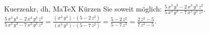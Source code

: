 \begin{MAufgabe}{Kuerzen}{kr, dh, MaTeX}
K\"urzen Sie soweit m\"oglich: $\frac{5\, x^3\, y^3 - 2\, x^3\, y^3\, z^2}{5\, x^3\, y^3 - 7\, x^3\, y^3\, z^2}$.\\ 
\ifLsg\MLoesung
\quad $\frac{5\, x^3\, y^3 - 2\, x^3\, y^3\, z^2}{5\, x^3\, y^3 - 7\, x^3\, y^3\, z^2}=\frac{(x^3\, y^3)\cdot(5 - 2\, z^2)}{(x^3\, y^3)\cdot(5 - 7\, z^2)}=\frac{5 - 2\, z^2}{5 - 7\, z^2}=\frac{2\, z^2 - 5}{7\, z^2 - 5}$.\else\relax\fi
 \end{MAufgabe}